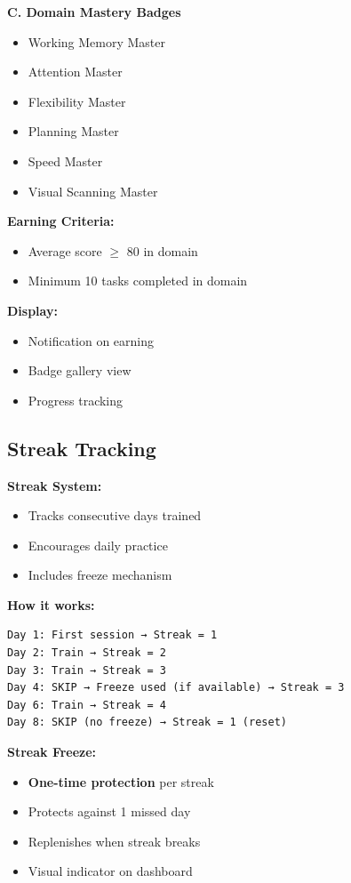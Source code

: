 \documentclass[12pt,a4paper]{article}
\begin{document}
\textbf{C. Domain Mastery Badges}
\begin{itemize}
    \item Working Memory Master
    \item Attention Master
    \item Flexibility Master
    \item Planning Master
    \item Speed Master
    \item Visual Scanning Master
\end{itemize}

\textbf{Earning Criteria:}
\begin{itemize}
    \item Average score $\geq$ 80 in domain
    \item Minimum 10 tasks completed in domain
\end{itemize}

\textbf{Display:}
\begin{itemize}
    \item Notification on earning
    \item Badge gallery view
    \item Progress tracking
\end{itemize}

\subsection{Streak Tracking}

\textbf{Streak System:}
\begin{itemize}
    \item Tracks consecutive days trained
    \item Encourages daily practice
    \item Includes freeze mechanism
\end{itemize}

\textbf{How it works:}

\begin{verbatim}
Day 1: First session → Streak = 1
Day 2: Train → Streak = 2
Day 3: Train → Streak = 3
Day 4: SKIP → Freeze used (if available) → Streak = 3
Day 6: Train → Streak = 4
Day 8: SKIP (no freeze) → Streak = 1 (reset)
\end{verbatim}

\textbf{Streak Freeze:}
\begin{itemize}
    \item \textbf{One-time protection} per streak
    \item Protects against 1 missed day
    \item Replenishes when streak breaks
    \item Visual indicator on dashboard
\end{itemize}
\end{document}
